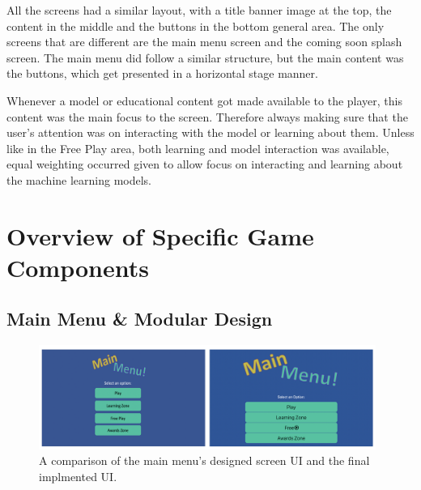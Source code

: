 	All the screens had a similar layout, with a title banner image at the top, the content in the middle and the buttons in the bottom general area. The only screens that are different are the main menu screen and the coming soon splash screen. The main menu did follow a similar structure, but the main content was the buttons, which get presented in a horizontal stage manner.
	
	Whenever a model or educational content got made available to the player, this content was the main focus to the screen. Therefore always making sure that the user's attention was on interacting with the model or learning about them. Unless like in the Free Play area, both learning and model interaction was available, equal weighting occurred given to allow focus on interacting and learning about the machine learning models.
		
	
	
	
	
		
		
		
	\section{Overview of Specific Game Components}
		\label{sec:overview_game_components}
		
	
	\subsection{Main Menu \& Modular Design}
	\begin{figure}[t]
		\begin{center}
			\includegraphics[width=11cm]{graphics/main_menu.png}
			\caption{A comparison of the main menu's designed screen UI and the final implmented UI.}
			\label{fig:ui_mm}
		\end{center}
		
	\end{figure}

